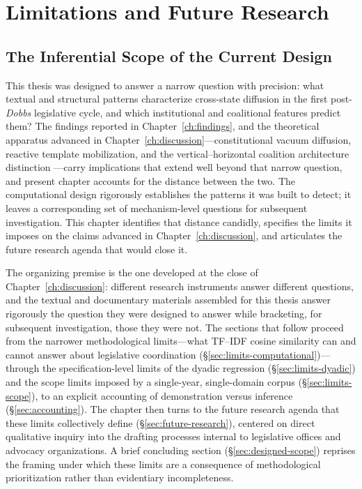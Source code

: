 \chapter{Limitations and Future Research}
\label{ch:limitations}

\section{The Inferential Scope of the Current Design}
\label{sec:inferential-scope}
This thesis was designed to answer a narrow question with precision: what textual and structural patterns characterize cross-state diffusion in the first post-\textit{Dobbs} legislative cycle, and which institutional and coalitional features predict them? The findings reported in Chapter~\ref{ch:findings}, and the theoretical apparatus advanced in Chapter~\ref{ch:discussion}---constitutional vacuum diffusion, reactive template mobilization, and the vertical--horizontal coalition architecture distinction ---carry implications that extend well beyond that narrow question, and present chapter accounts for the distance between the two. The computational design rigorously establishes the patterns it was built to detect; it leaves a corresponding set of mechanism-level questions for subsequent investigation. This chapter identifies that distance candidly, specifies the limits it imposes on the claims advanced in Chapter~\ref{ch:discussion}, and articulates the future research agenda that would close it.

The organizing premise is the one developed at the close of Chapter~\ref{ch:discussion}: different research instruments answer different questions, and the textual and documentary materials assembled for this thesis answer rigorously the question they were designed to answer while bracketing, for subsequent investigation, those they were not. The sections that follow proceed from the narrower methodological limits---what TF--IDF cosine similarity can and cannot answer about legislative coordination (\S\ref{sec:limits-computational})---through the specification-level limits of the dyadic regression (\S\ref{sec:limits-dyadic}) and the scope limits imposed by a single-year, single-domain corpus (\S\ref{sec:limits-scope}), to an explicit accounting of demonstration versus inference (\S\ref{sec:accounting}). The chapter then turns to the future research agenda that these limits collectively define (\S\ref{sec:future-research}), centered on direct qualitative inquiry into the drafting processes internal to legislative offices and advocacy organizations. A brief concluding section (\S\ref{sec:designed-scope}) reprises the framing under which these limits are a consequence of methodological prioritization rather than evidentiary incompleteness.

